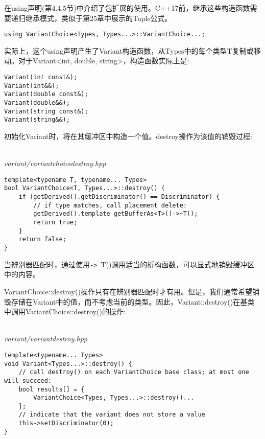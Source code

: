 \begin{tcolorbox}[colback=webgreen!5!white,colframe=webgreen!75!black]
\hspace*{0.75cm}在using声明(第4.4.5节)中介绍了包扩展的使用。C++17前，继承这些构造函数需要递归继承模式，类似于第25章中展示的Tuple公式。
\end{tcolorbox}

\begin{lstlisting}[style=styleCXX]
using VariantChoice<Types, Types...>::VariantChoice...;
\end{lstlisting}

实际上，这个using声明产生了Variant构造函数，从Types中的每个类型T复制或移动。对于Variant<int, double, string>，构造函数实际上是:

\begin{lstlisting}[style=styleCXX]
Variant(int const&);
Variant(int&&);
Variant(double const&);
Variant(double&&);
Variant(string const&);
Variant(string&&);
\end{lstlisting}


初始化Variant时，将在其缓冲区中构造一个值。destroy操作为该值的销毁过程:

\hspace*{\fill} \\ %
\noindent
\textit{variant/variantchoicedestroy.hpp}
\begin{lstlisting}[style=styleCXX]
template<typename T, typename... Types>
bool VariantChoice<T, Types...>::destroy() {
	if (getDerived().getDiscriminator() == Discriminator) {
		// if type matches, call placement delete:
		getDerived().template getBufferAs<T>()->~T();
		return true;
	}
	return false;
}
\end{lstlisting}

当辨别器匹配时，通过使用\texttt{->}~T()调用适当的析构函数，可以显式地销毁缓冲区中的内容。 

VariantChoice::destroy()操作只有在辨别器匹配时才有用。但是，我们通常希望销毁存储在Variant中的值，而不考虑当前的类型。因此，Variant::destroy()在基类中调用VariantChoice::destroy()的操作:

\hspace*{\fill} \\ %
\noindent
\textit{variant/variantdestroy.hpp}
\begin{lstlisting}[style=styleCXX]
template<typename... Types>
void Variant<Types...>::destroy() {
	// call destroy() on each VariantChoice base class; at most one will succeed:
	bool results[] = {
		VariantChoice<Types, Types...>::destroy()...
	};
	// indicate that the variant does not store a value
	this->setDiscriminator(0);
}
\end{lstlisting}

